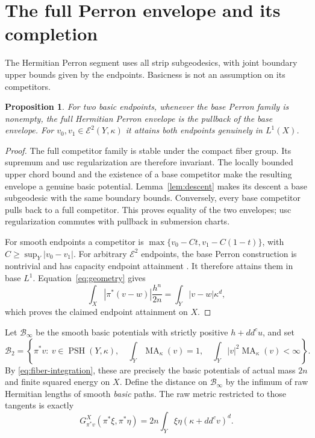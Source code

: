 \documentclass[11pt]{article}
\newcommand{\ddc}{dd^c}
\newcommand{\PSH}{\operatorname{PSH}}
\newcommand{\MA}{\operatorname{MA}}
\newcommand{\BB}{\mathcal B}
\newtheorem{proposition}[theorem]{Proposition}
\theoremstyle{remark}\newtheorem{remark}[theorem]{Remark}
\begin{document}
\section{The full Perron envelope and its completion}
The Hermitian Perron segment uses all strip subgeodesics, with joint
boundary upper bounds given by the endpoints. Basicness is not an
assumption on its competitors.
\begin{proposition}\label{prop:perron}
For two basic endpoints, whenever the base Perron family is nonempty,
the full Hermitian Perron envelope is the pullback of the base envelope.
For $v_0,v_1\in\mathcal E^2(Y,\kappa)$ it attains both endpoints
genuinely in $L^1(X)$.
\end{proposition}
\begin{proof}
The full competitor family is stable under the compact fiber group.
Its supremum and usc regularization are therefore invariant. The locally
bounded upper chord bound and the existence of a base competitor make
the resulting envelope a genuine basic potential. Lemma~\ref{lem:descent}
makes its descent a base subgeodesic with the same boundary bounds.
Conversely, every base competitor pulls back to a full competitor.
This proves equality of the two envelopes; usc regularization commutes
with pullback in submersion charts.

For smooth endpoints a competitor is
$\max\{v_0-Ct,v_1-C(1-t)\}$, with
$C\geq\sup_Y|v_0-v_1|$. For arbitrary $\mathcal E^2$ endpoints,
the base Perron construction is nontrivial and has capacity endpoint
attainment \cite[Theorem 5.2 and Corollary 5.4]{Darvas}. It therefore
attains them in base $L^1$. Equation~\eqref{eq:geometry} gives
\[
 \int_X|\pi^*(v-w)|\frac{h^n}{2n}
       =\int_Y|v-w|\kappa^d,
\]
which proves the claimed endpoint attainment on $X$.
\end{proof}

Let $\BB_\infty$ be the smooth basic potentials with strictly positive
$h+\ddc u$, and set
\[
 \BB_2=\left\{\pi^*v:\ v\in\PSH(Y,\kappa),\quad
 \int_Y\MA_\kappa(v)=1,\quad
 \int_Y|v|^2\MA_\kappa(v)<\infty\right\}.
\]
By \eqref{eq:fiber-integration}, these are precisely the basic potentials
of actual mass $2n$ and finite squared energy on $X$.
Define the distance on $\BB_\infty$ by the infimum of raw Hermitian
lengths of smooth \emph{basic} paths. The raw metric restricted to those
tangents is exactly
\begin{equation}\label{eq:metric}
 G^X_{\pi^*v}(\pi^*\xi,\pi^*\eta)
       =2n\int_Y\xi\eta(\kappa+\ddc v)^d.
\end{equation}
\end{document}

